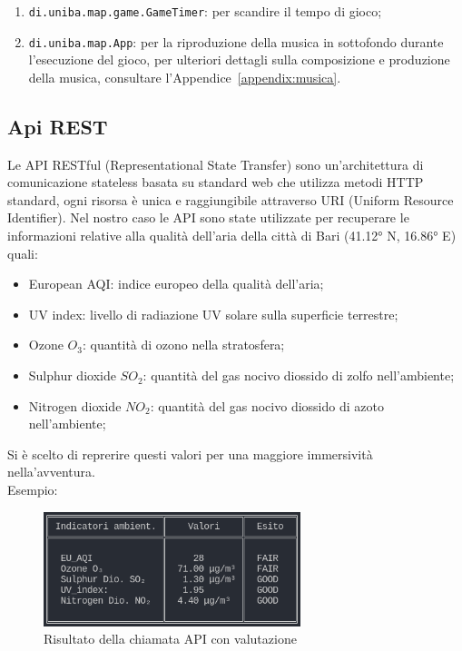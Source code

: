 \documentclass[italian,12pt,a4paper]{article}
\begin{document}
	\begin{enumerate}
		\item \texttt{di.uniba.map.game.GameTimer}: per scandire il tempo di gioco;
		\item \texttt{di.uniba.map.App}: per la riproduzione della musica in sottofondo durante l'esecuzione del gioco, per ulteriori dettagli sulla composizione e produzione della musica, consultare l'Appendice~\ref{appendix:musica}.
	\end{enumerate}
	
	\subsection{Api REST}
	Le API RESTful (Representational State Transfer) sono un'architettura di comunicazione stateless basata su standard web che utilizza metodi HTTP standard, ogni risorsa è unica e raggiungibile attraverso URI  (Uniform Resource Identifier).
	Nel nostro caso le API sono state utilizzate per recuperare le informazioni relative alla qualità dell'aria della città di Bari (41.12° N, 16.86° E) quali:

		\begin{itemize}
			\item European AQI: indice europeo della qualità dell'aria; 
			\item UV index: livello di radiazione UV solare sulla superficie terrestre;
			\item Ozone $O_3$: quantità di ozono nella stratosfera;
			\item Sulphur dioxide $SO_2$: quantità del gas nocivo diossido di zolfo nell'ambiente;
			\item Nitrogen dioxide $NO_2$: quantità del gas nocivo diossido di azoto nell'ambiente;
			
		\end{itemize}
	Si è scelto di reprerire questi valori per una maggiore immersività nella'avventura.\\
	Esempio:
	\begin{figure}[!h]
		\centering
		\includegraphics[width=7.5cm]{screen_api}
		\caption{Risultato della chiamata API con valutazione}
		\label{fig:screenapi}
	\end{figure}
	
\end{document}

